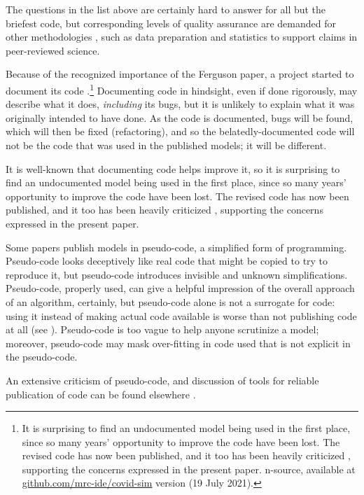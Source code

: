 \documentclass{comjnl}
\begin{document}
The questions in the list above are certainly hard to answer for all but the briefest code, but corresponding levels of quality assurance are demanded for other methodologies \cite{notebooks,popper-conjectures-refutations,tripod,prisma,nih-policy,nih-nature}, such as data preparation and statistics to support claims in peer-reviewed science. 

Because of the recognized importance of the Ferguson paper, a project started to document its code  \cite{refactoring}.\footnote{It is surprising to find an undocumented model being used in the first place, since so many years' opportunity to improve the code have been lost. The revised code has now been published, and it too has been heavily criticized , supporting the concerns expressed in the present paper.
n-source, available at \url{github.com/mrc-ide/covid-sim} version (19 July 2021).} Documenting code in hindsight, even if done rigorously, may describe what it does, \emph{including\/} its bugs, but it is unlikely to explain what it was originally intended to have done. As the code is documented, bugs will be found, which will then be fixed (refactoring), and so the belatedly-documented code will not be the code that was used in the published models; it will be different. 

It is well-known that documenting code helps improve it, so it is surprising to find an undocumented model being used in the first place, since so many years' opportunity to improve the code have been lost. The revised code has now been published, and it too has been heavily criticized , supporting the concerns expressed in the present paper.

Some papers  publish models in pseudo-code, a simplified form of programming. Pseudo-code looks deceptively like real code that might be copied to try to reproduce it, but pseudo-code introduces invisible and unknown simplifications. Pseudo-code, properly used, can give a helpful impression of the overall approach of an algorithm, certainly, but pseudo-code alone is not a surrogate for code: using it instead of making actual code available is worse than not publishing code at all (see \cite{chinese}). Pseudo-code is too vague to help anyone scrutinize a model; moreover, pseudo-code may mask over-fitting in code used that is not explicit in the pseudo-code. 

An extensive criticism of pseudo-code, and discussion of tools for reliable publication of code can be found elsewhere \cite{relit}. 
\end{document}
